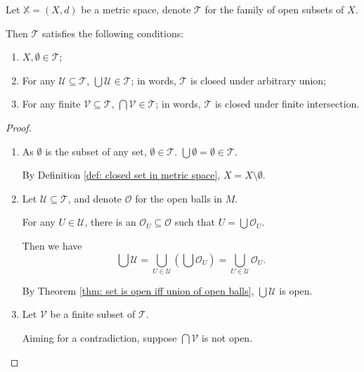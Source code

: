 \begin{theorem}
	Let $\mathbb X = (X, d)$ be a metric space, denote $\mathcal T$ for the family of open subsets of $X$.
	
	Then $\mathcal T$ satisfies the following conditions:
	
	\begin{enumerate}[\bf O1.]
		\item $X, \emptyset \in \mathcal T$;
		\item For any $\mathcal U \subseteq \mathcal T$, $\bigcup \mathcal U \in \mathcal T$; in words, $\mathcal T$ is closed under arbitrary union;
		\item For any finite $\mathcal V \subseteq \mathcal T$, $\bigcap \mathcal V \in \mathcal T$; in words, $\mathcal T$ is closed under finite intersection.
	\end{enumerate}
	
	\begin{proof} \
		\begin{enumerate}[\bf O1.]
			\item
				As $\emptyset$ is the subset of any set, $\emptyset \in \mathcal T$. $\bigcup \emptyset = \emptyset \in \mathcal T$.
			
				By Definition \ref{def: closed set in metric space}, $X = X \setminus \emptyset$.
				
				\qedlm
				
			\item 
				Let $\mathcal U \subseteq \mathcal T$, and denote $\mathcal O$ for the open balls in $M$.
			
				For any $U \in \mathcal U$, there is an $\mathcal O_U \subseteq \mathcal O$ such that $U = \bigcup \mathcal O_U$. 
				
				Then we have
				$$
				\bigcup \mathcal U = \bigcup_{U \in \mathcal U} \left( \bigcup \mathcal O_U \right) = \bigcup_{U \in \mathcal U} \mathcal O_U.
				$$
				
				By Theorem \ref{thm: set is open iff union of open balls}, $\bigcup \mathcal U$ is open.
				
				\qedlm
				
			\item
				Let $\mathcal V$ be a finite subset of $\mathcal T$.
				
				Aiming for a contradiction, suppose $\bigcap \mathcal V$ is not open.
				

\end{enumerate}
\end{proof}
\end{theorem}
